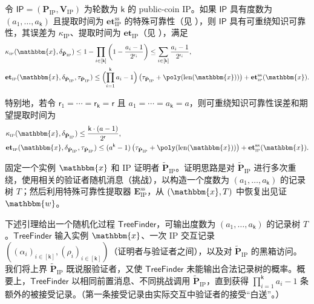 \documentclass[american,singlepageview]{snargs-book-zh}
\newcommand{\Malicious}[1]{\tilde{#1}}
\newcommand{\BitSize}[1]{\mathrm{len}(#1)}
\newcommand{\Instance}{\mathbbm{x}}
\newcommand{\Witness}{\mathbbm{w}}
\newcommand{\ProtoProver}{P}
\newcommand{\ProtoVerifier}{V}
\newcommand{\ProtoExtractor}{E}
\newcommand{\ProtoKnowledgeError}{\kappa}
\newcommand{\ProtoKnowledgeTime}{\mathbf{et}}
\newcommand{\ProtoRoundComplexity}{\mathsf{k}}
\newcommand{\ProtoRandomnessComplexity}{\mathsf{r}}
\newcommand{\RoundIndex}{i}
\newcommand{\IPSymbol}{\mathsf{IP}}
\newcommand{\IPSystem}{(\IPProver,\IPVerifier)}
\newcommand{\IPSubscript}{\scriptscriptstyle\mathrm{IP}}
\newcommand{\IPFormat}[1]{\mathbf{#1}}
\newcommand{\IPProver}{\IPFormat{\ProtoProver}_{\IPSubscript}}
\newcommand{\IPVerifier}{\IPFormat{\ProtoVerifier}_{\IPSubscript}}
\newcommand{\IPExtractor}{\IPFormat{\ProtoExtractor}_{\IPSubscript}}
\newcommand{\IPKnowledgeError}{\ProtoKnowledgeError_{\IPSubscript}}
\newcommand{\IPKnowledgeTime}{\ProtoKnowledgeTime_{\IPSubscript}}
\newcommand{\IPMaliciousProver}{\Malicious{\IPFormat{\ProtoProver}}_{\IPSubscript}}
\newcommand{\IPRoundComplexity}{\ProtoRoundComplexity}
\newcommand{\IPRandomnessComplexity}{\ProtoRandomnessComplexity}
\newcommand{\IPRandomnessCardinality}[1]{2^{\ProtoRandomnessComplexity_{#1}}}
\newcommand{\IPProverMessage}{\alpha}
\newcommand{\IPVerifierRandomMessage}{\rho}
\newcommand{\IPTuple}[1]{(#1_{\RoundIndex})_{\RoundIndex \in [\IPRoundComplexity]}}
\newcommand{\IPTranscript}{(\IPTuple{\IPProverMessage},\IPTuple{\IPVerifierRandomMessage})}
\newcommand{\ProverFailureProbability}[1]{\delta_{#1}}
\newcommand{\ProverRunningTime}[1]{\tau_{#1}}
\newcommand{\SSSuperscript}{\mathrm{ss}}
\newcommand{\SSArity}{a}
\newcommand{\SSTree}{T}
\newcommand{\IPSSExtractor}{\IPExtractor^{\SSSuperscript}}
\newcommand{\IPSSKnowledgeTime}{\ProtoKnowledgeTime_{\IPSubscript}^{\SSSuperscript}}
\newcommand{\SSTreeFinder}{\mathsf{TreeFinder}}
\newcommand{\IPKowledgeErrorMainFromSS}{\prod_{\RoundIndex \in [\IPRoundComplexity]} \left( 1 - \frac{\SSArity_{\RoundIndex}-1}{\IPRandomnessCardinality{\RoundIndex}} \right)}
\newcommand{\IPKowledgeErrorFromSS}{1-\IPKowledgeErrorMainFromSS}
\newcommand{\IPKowledgeErrorSimpleFromSS}{\sum_{\RoundIndex \in [\IPRoundComplexity]} \frac{\SSArity_{\RoundIndex}-1}{\IPRandomnessCardinality{\RoundIndex}}}
\begin{document}
\begin{theorem}
\label{theorem:ss-to-knowledge-soundness-for-ip}
令 $\IPSymbol=\IPSystem$ 为轮数为 $\IPRoundComplexity$ 的 public-coin IP。如果 $\IPSymbol$ 具有度数为 $(\SSArity_{1},\dots,\SSArity_{\IPRoundComplexity})$ 且提取时间为 $\IPSSKnowledgeTime$ 的特殊可靠性（见 ），则 $\IPSymbol$ 具有可重绕知识可靠性，其误差为 $\IPKnowledgeError$、提取时间为 $\IPKnowledgeTime$（见 ），满足
\begin{align*}
& \IPKnowledgeError(\Instance,\ProverFailureProbability{\IPMaliciousProver})
  \le
  \IPKowledgeErrorFromSS
  \le
  \IPKowledgeErrorSimpleFromSS
  ,\\
& \IPKnowledgeTime(\Instance,\ProverFailureProbability{\IPMaliciousProver},\ProverRunningTime{\IPMaliciousProver})
  \le
  \Bigl(\prod_{\RoundIndex=1}^{\IPRoundComplexity}\SSArity_{\RoundIndex}-1\Bigr)\,
  \bigl(\ProverRunningTime{\IPMaliciousProver}+\poly(\BitSize{\Instance})\bigr)
  +\IPSSKnowledgeTime(\Instance).
\end{align*}
\end{theorem}

特别地，若令 $\IPRandomnessComplexity_{1}=\cdots=\IPRandomnessComplexity_{\IPRoundComplexity}=\IPRandomnessComplexity$ 且 $\SSArity_{1}=\cdots=\SSArity_{\IPRoundComplexity}=\SSArity$，则可重绕知识可靠性误差和期望提取时间为
\begin{align*}
& \IPKnowledgeError(\Instance,\ProverFailureProbability{\IPMaliciousProver})
  \le
  \frac{\IPRoundComplexity\cdot(\SSArity-1)}{2^{\IPRandomnessComplexity}}
  ,\\
& \IPKnowledgeTime(\Instance,\ProverFailureProbability{\IPMaliciousProver},\ProverRunningTime{\IPMaliciousProver})
  \le
  (\SSArity^{\IPRoundComplexity}-1)\,
  \bigl(\ProverRunningTime{\IPMaliciousProver}+\poly(\BitSize{\Instance})\bigr)
  +\IPSSKnowledgeTime(\Instance).
\end{align*}

固定一个实例 $\Instance$ 和 IP 证明者 $\IPMaliciousProver$。证明思路是对 $\IPMaliciousProver$ 进行多次重绕，使用相关的验证者随机消息（挑战），以构造一个度数为 $(\SSArity_{1},\dots,\SSArity_{\IPRoundComplexity})$ 的记录树 $\SSTree$；然后利用特殊可靠性提取器 $\IPSSExtractor$，从 $(\Instance,\SSTree)$ 中恢复出见证 $\Witness$。

下述引理给出一个随机化过程 $\SSTreeFinder$，可输出度数为 $(\SSArity_{1},\dots,\SSArity_{\IPRoundComplexity})$ 的记录树 $\SSTree$。$\SSTreeFinder$ 输入实例 $\Instance$、一次 IP 交互记录 $\IPTranscript$（证明者与验证者之间），以及对 $\IPMaliciousProver$ 的黑箱访问。我们将上界 $\IPMaliciousProver$ 既说服验证者，又使 $\SSTreeFinder$ 未能输出合法记录树的概率。概要上，$\SSTreeFinder$ 以相同前置消息、不同挑战调用 $\IPMaliciousProver$，直到获得 $\prod_{\RoundIndex=1}^{\IPRoundComplexity}\SSArity_{\RoundIndex}-1$ 条额外的被接受记录。（第一条接受记录由实际交互中验证者的接受“白送”。）
\end{document}
